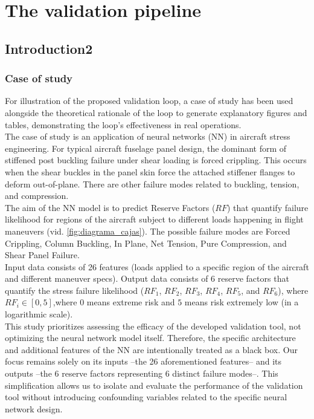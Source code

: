 \chapter{The validation pipeline}
%
\label{chap:Chap_1}
%
%
\section{Introduction2}
\subsection{Case of study}
\indent For illustration of the proposed validation loop, a case of study has been used alongside the theoretical rationale of the loop to generate explanatory figures and tables, demonstrating the loop's effectiveness in real operations.\\
%
\indent The case of study is an application of neural networks (NN) in aircraft stress engineering. For typical aircraft fuselage panel design, the dominant form of stiffened post buckling failure under shear loading is forced crippling\cite{bijlaard1955buckling}. This occurs when the shear buckles in the panel skin force the attached stiffener flanges to deform out-of-plane. There are other failure modes related to buckling, tension, and compression.\\
%
\indent The aim of the NN model is to predict Reserve Factors ($RF$) that quantify failure likelihood for regions of the aircraft subject to different loads happening in flight maneuvers (vid. \autoref{fig:diagrama_cajas}). The possible failure modes are Forced Crippling, Column Buckling, In Plane, Net Tension, Pure Compression, and Shear Panel Failure.\\
%
\indent Input data consists of 26 features (loads applied to a specific region of the aircraft and different maneuver specs). Output data consists of 6 reserve factors that quantify the stress failure likelihood ($RF_1$, $RF_2$, $RF_3$, $RF_4$, $RF_5$, and $RF_6$), where $RF_i\in [0,5]$,where $0$ means extreme risk and $5$ means risk extremely low (in a logarithmic scale).\\
%
\indent This study prioritizes assessing the efficacy of the developed validation tool, not optimizing the neural network model itself. Therefore, the specific architecture and additional features of the NN are intentionally treated as a black box. Our focus remains solely on its inputs --the 26 aforementioned features-- and its outputs --the 6 reserve factors representing 6 distinct failure modes--. This simplification allows us to isolate and evaluate the performance of the validation tool without introducing confounding variables related to the specific neural network design.\\
